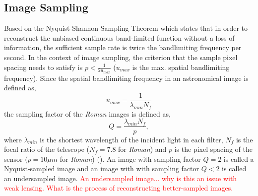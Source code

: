 \documentclass[fleqn,usenatbib]{mnras}
\begin{document}
\subsection{Image Sampling}
Based on the Nyquist-Shannon Sampling Theorem which states that in order to reconstruct the unbiased continuous band-limited function without a loss of information, the sufficient sample rate is twice the bandlimiting frequency per second. In the context of image sampling, the criterion that the sample pixel spacing needs to satisfy is $p < \frac{1}{2u_{max}}$ ($u_{max}$ is the max. spatial bandlimiting frequency). Since the spatial bandlimiting frequency in an astronomical image is defined as, 
\begin{equation}
    u_{max} = \frac{1}{\lambda_{min}N_{f}}
\end{equation}
the sampling factor of the \emph{Roman} images is defined as, 
\begin{equation}
    Q = \frac{\lambda_{min}N_{f}}{p}, 
    \label{eqn:sampling}
\end{equation}
where $\lambda_{min}$ is the shortest wavelength of the incident light in each filter, $N_{f}$ is the focal ratio of the telescope ($N_{f}=7.8$ for \emph{Roman}) and $p$ is the pixel spacing of the sensor ($p=10\mu m$ for \emph{Roman}) (\citealt{2013PASP..125.1496S}). An image with sampling factor $Q=2$ is called a Nyquist-sampled image and an image with with sampling factor $Q<2$ is called an undersampled image. \textcolor{red}{An undersampled image... why is this an issue with weak lensing. What is the process of reconstructing better-sampled images.}
\end{document}
